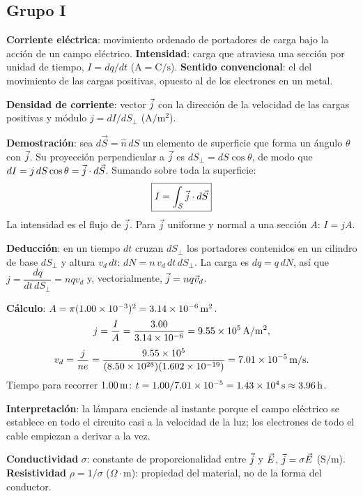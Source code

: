 
\subsection*{Grupo I}
\textbf{Corriente eléctrica}: movimiento ordenado de portadores de carga bajo la acción de un campo eléctrico. \textbf{Intensidad}: carga que atraviesa una sección por unidad de tiempo, $I=dq/dt$ ($\mathrm{A}=\mathrm{C/s}$). \textbf{Sentido convencional}: el del movimiento de las cargas positivas, opuesto al de los electrones en un metal.

\textbf{Densidad de corriente}: vector $\vec{j}$ con la dirección de la velocidad de las cargas positivas y módulo $j=dI/dS_\perp$ ($\mathrm{A/m^2}$).

\textbf{Demostración}: sea $d\vec S=\hat n\,dS$ un elemento de superficie que forma un ángulo $\theta$ con $\vec{j}$. Su proyección perpendicular a $\vec{j}$ es $dS_\perp=dS\cos\theta$, de modo que $dI=j\,dS\cos\theta=\vec{j}\cdot d\vec S$. Sumando sobre toda la superficie:
\[
\boxed{I=\int_S\vec{j}\cdot d\vec S}
\]
La intensidad es el flujo de $\vec{j}$. Para $\vec{j}$ uniforme y normal a una sección $A$: $I=jA$.

\textbf{Deducción}: en un tiempo $dt$ cruzan $dS_\perp$ los portadores contenidos en un cilindro de base $dS_\perp$ y altura $v_d\,dt$: $dN=n\,v_d\,dt\,dS_\perp$. La carga es $dq=q\,dN$, así que $j=\dfrac{dq}{dt\,dS_\perp}=nqv_d$ y, vectorialmente, $\vec{j}=nq\vec v_d$.

\textbf{Cálculo}: $A=\pi(1.00\times10^{-3})^2=3.14\times10^{-6}\,\mathrm{m^2}$.
\[
j=\frac{I}{A}=\frac{3.00}{3.14\times10^{-6}}=9.55\times10^{5}\,\mathrm{A/m^2},
\]
\[
v_d=\frac{j}{ne}=\frac{9.55\times10^5}{(8.50\times10^{28})(1.602\times10^{-19})}=7.01\times10^{-5}\,\mathrm{m/s}.
\]
Tiempo para recorrer $1.00\,\mathrm{m}$: $t=1.00/7.01\times10^{-5}=1.43\times10^4\,\mathrm{s}\approx3.96\,\mathrm{h}$.

\textbf{Interpretación}: la lámpara enciende al instante porque el campo eléctrico se establece en todo el circuito casi a la velocidad de la luz; los electrones de todo el cable empiezan a derivar a la vez.

\textbf{Conductividad} $\sigma$: constante de proporcionalidad entre $\vec{j}$ y $\vec{E}$, $\vec{j}=\sigma\vec{E}$ ($\mathrm{S/m}$). \textbf{Resistividad} $\rho=1/\sigma$ ($\Omega\cdot\mathrm{m}$): propiedad del material, no de la forma del conductor.

